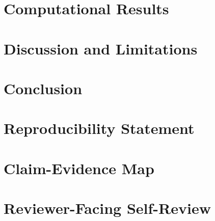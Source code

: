 \documentclass[11pt]{article}
\begin{document}
\section{Computational Results}
\label{sec:results}


\section{Discussion and Limitations}
\label{sec:discussion}


\section{Conclusion}
\label{sec:conclusion}


\section*{Reproducibility Statement}





\appendix
\section{Claim-Evidence Map}
\label{app:claim_evidence}


\section{Reviewer-Facing Self-Review}
\label{app:self_review}

\end{document}
